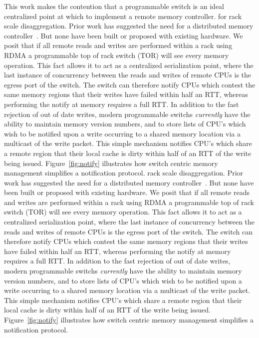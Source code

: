 This work makes the contention that a programmable switch is an ideal
centralized point at which to implement a remote memory controller.
for rack scale disaggregation. Prior work has suggested the need for a
distributed memory controller~\cite{254120}. But none have been built
or proposed with existing hardware. We posit that if all remote reads
and writes are performed within a rack using RDMA a programmable top
of rack switch (TOR) will see every memory operation. This fact allows
it to act as a centralized serialization point, where the last
instance of concurrency between the reads and writes of remote CPUs is
the egress port of the switch. The switch can therefore notify CPUs
which contest the same memory regions that their writes have failed
within half an RTT, whereas performing the notify at memory requires a
full RTT. In addition to the fast rejection of out of date writes,
modern programmable switchs \textit{currently} have the ability to
maintain memory version numbers, and to store lists of CPU's which
wish to be notified upon a write occurring to a shared memory location
via a multicast of the write packet. This simple mechanism notifies
CPU's which share a remote region that their local cache is dirty
within half of an RTT of the write being issued.
Figure~\ref{fig:notify} illustrates how switch centric memory
management simplifies a notification protocol.  rack scale
disaggregation. Prior work has suggested the need for a distributed
memory controller~\cite{254120}. But none have been built or proposed
with existing hardware. We posit that if all remote reads and writes
are performed within a rack using RDMA a programmable top of rack
switch (TOR) will see every memory operation. This fact allows it to
act as a centralized serialization point, where the last instance of
concurrency between the reads and writes of remote CPUs is the egress
port of the switch. The switch can therefore notify CPUs which contest
the same memory regions that their writes have failed within half an
RTT, whereas performing the notify at memory requires a full RTT. In
addition to the fast rejection of out of date writes, modern
programmable switchs \textit{currently} have the ability to maintain
memory version numbers, and to store lists of CPU's which wish to be
notified upon a write occurring to a shared memory location via a
multicast of the write packet. This simple mechanism notifies CPU's
which share a remote region that their local cache is dirty within
half of an RTT of the write being issued.  Figure~\ref{fig:notify}
illustrates how switch centric memory management simplifies a
notification protocol. 

